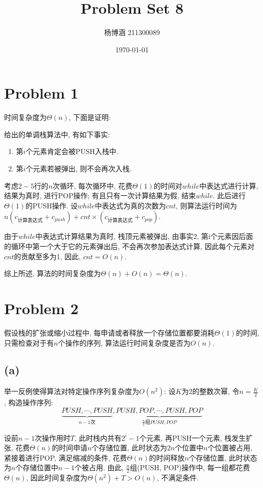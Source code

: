 \documentclass{article}
\title{\vspace{-2cm}Problem Set 8}
\author{杨博涵 211300089}
\date{\today}
\begin{document}
\maketitle

\section{Problem 1}
时间复杂度为$\Theta(n)$, 下面是证明:

给出的单调栈算法中, 有如下事实:
\begin{enumerate}
    \item 第$i$个元素肯定会被PUSH入栈中.
    \item 第$i$个元素若被弹出, 则不会再次入栈.
\end{enumerate}

考虑$2-5$行的$n$次循环, 每次循环中, 花费$\Theta(1)$的时间对$while$中表达式进行计算, 结果为真时, 进行POP操作; 有且只有一次计算结果为假, 结束$while$. 此后进行$\Theta(1)$的PUSH操作. 设$while$中表达式为真的次数为$cnt$, 则算法运行时间为$n(c_{\text{计算表达式}} + c_{push}) + cnt \times (c_{\text{计算表达式}} + c_{pop})$.

由于$while$中表达式计算结果为真时, 栈顶元素被弹出, 由事实2, 第i个元素因后面的循环中第一个大于它的元素弹出后, 不会再次参加表达式计算, 因此每个元素对$cnt$的贡献至多为1, 因此, $cnt = O(n)$.

综上所述, 算法的时间复杂度为$\Theta(n) + O(n) = \Theta(n)$.

\section{Problem 2}

假设栈的扩张或缩小过程中, 每申请或者释放一个存储位置都要消耗$\Theta(1)$的时间, 只需检查对于有$n$个操作的序列, 算法运行时间复杂度是否为$O(n)$.

\subsection{(a)}

举一反例使得算法对特定操作序列复杂度为$O(n^2)$: 设$K$为2的整数次幂, 令$n = \frac{K}{2}$, 构造操作序列:
$$
\underbrace{PUSH, \cdots, PUSH}_{n-1\text{次}}, \underbrace{PUSH, POP, \cdots, PUSH, POP}_{\frac{n}{2} \text{组}PUSH, POP}
$$

设前$n-1$次操作用时$T$, 此时栈内共有$2^i - 1$个元素, 再PUSH一个元素, 栈发生扩张, 花费$\Theta(n)$的时间申请$n$个存储位置, 此时状态为$2n$个位置中$n$个位置被占用, 紧接着进行POP, 满足缩减的条件, 花费$\Theta(n)$的时间释放$n$个存储位置, 此时状态为$n$个存储位置中$n-1$个被占用. 由此, $\frac{n}{2}$组(PUSH, POP)操作中, 每一组都花费$\Theta(n)$, 因此时间复杂度为$\Theta(n^2) + T > O(n)$, 不满足条件.
\end{document}
